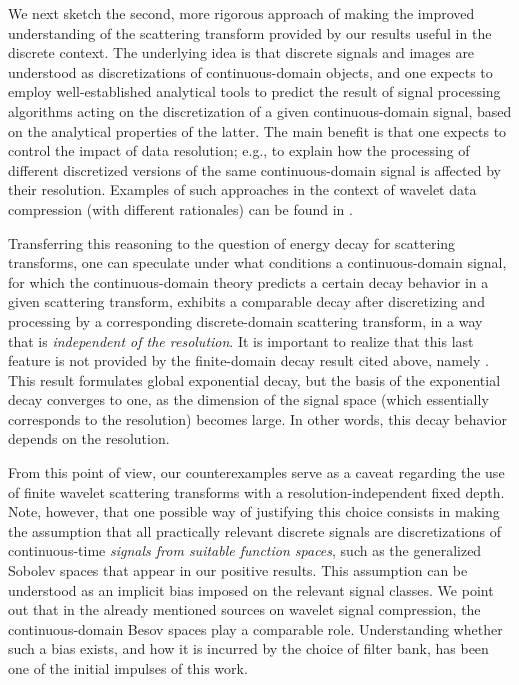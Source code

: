 \documentclass[11pt]{amsart}
\newenvironment{proof sketch} {\textit{Proof sketch.}}{}
\begin{document}
  We next sketch the second, more rigorous approach of making the improved understanding of the scattering transform provided by our results useful in the discrete context. The underlying idea is that discrete signals and images are understood as discretizations of continuous-domain objects, and one expects to employ well-established analytical tools to predict the result of signal processing algorithms acting on the discretization of a given continuous-domain signal, based on the analytical properties of the latter. The main benefit is that one expects to control the impact of data resolution; e.g., to explain how the processing of different discretized versions of the same continuous-domain signal is affected by their resolution. Examples of such approaches in the context of wavelet
  data compression (with different rationales) can be found in \cite{deVore1992image,donoho1998data}.

  Transferring this reasoning to the question of energy decay for scattering transforms, one can speculate under what conditions a continuous-domain signal, for which the continuous-domain theory predicts a certain decay behavior in a given scattering transform, exhibits a comparable decay after discretizing and processing by a corresponding discrete-domain scattering transform, in a way that is \textit{independent of the resolution}. It is important to realize that this last feature is not provided by the finite-domain decay result cited above, namely \cite[Proposition 3.3]{zou2020graph}. This result formulates global exponential decay, but the basis of the exponential decay converges to one, as the dimension of the signal space (which essentially corresponds to the resolution) becomes large. In other words, this decay behavior depends on the resolution.

  From this point of view, our counterexamples serve as a caveat regarding the use of finite wavelet scattering transforms with a resolution-independent fixed depth. Note, however, that one possible way of justifying this choice consists in making the assumption that all practically relevant discrete signals are discretizations of continuous-time \textit{signals from suitable function spaces}, such as the generalized Sobolev spaces that appear in our positive results. This assumption can be understood as an implicit bias imposed on the relevant signal classes.  We point out that in the already mentioned sources on wavelet signal compression, the continuous-domain Besov spaces play a comparable role.
  Understanding whether such a bias exists, and how it is incurred by the choice of filter bank, has been one of the initial impulses of this work.
\end{document}

